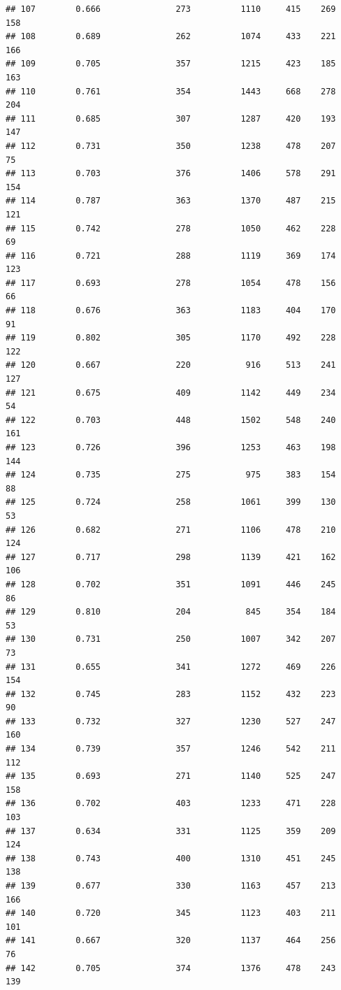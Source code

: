 \documentclass[]{book}
\begin{document}
\begin{verbatim}
## 107        0.666               273          1110     415    269    158
## 108        0.689               262          1074     433    221    166
## 109        0.705               357          1215     423    185    163
## 110        0.761               354          1443     668    278    204
## 111        0.685               307          1287     420    193    147
## 112        0.731               350          1238     478    207     75
## 113        0.703               376          1406     578    291    154
## 114        0.787               363          1370     487    215    121
## 115        0.742               278          1050     462    228     69
## 116        0.721               288          1119     369    174    123
## 117        0.693               278          1054     478    156     66
## 118        0.676               363          1183     404    170     91
## 119        0.802               305          1170     492    228    122
## 120        0.667               220           916     513    241    127
## 121        0.675               409          1142     449    234     54
## 122        0.703               448          1502     548    240    161
## 123        0.726               396          1253     463    198    144
## 124        0.735               275           975     383    154     88
## 125        0.724               258          1061     399    130     53
## 126        0.682               271          1106     478    210    124
## 127        0.717               298          1139     421    162    106
## 128        0.702               351          1091     446    245     86
## 129        0.810               204           845     354    184     53
## 130        0.731               250          1007     342    207     73
## 131        0.655               341          1272     469    226    154
## 132        0.745               283          1152     432    223     90
## 133        0.732               327          1230     527    247    160
## 134        0.739               357          1246     542    211    112
## 135        0.693               271          1140     525    247    158
## 136        0.702               403          1233     471    228    103
## 137        0.634               331          1125     359    209    124
## 138        0.743               400          1310     451    245    138
## 139        0.677               330          1163     457    213    166
## 140        0.720               345          1123     403    211    101
## 141        0.667               320          1137     464    256     76
## 142        0.705               374          1376     478    243    139

\end{verbatim}
\end{document}
